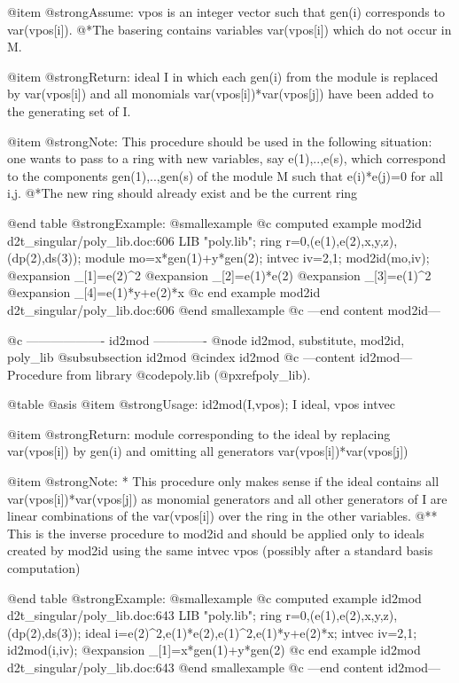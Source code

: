 @item @strong{Assume:}
vpos is an integer vector such that gen(i) corresponds
to var(vpos[i]).
@*The basering contains variables var(vpos[i]) which do not occur
in M.

@item @strong{Return:}
ideal I in which each gen(i) from the module is replaced by
var(vpos[i]) and all monomials var(vpos[i])*var(vpos[j]) have
been added to the generating set of I.

@item @strong{Note:}
This procedure should be used in the following situation:
one wants to pass to a ring with new variables, say e(1),..,e(s),
which correspond to the components gen(1),..,gen(s) of the
module M such that e(i)*e(j)=0 for all i,j.
@*The new ring should already exist and be the current ring

@end table
@strong{Example:}
@smallexample
@c computed example mod2id d2t_singular/poly_lib.doc:606 
LIB "poly.lib";
ring r=0,(e(1),e(2),x,y,z),(dp(2),ds(3));
module mo=x*gen(1)+y*gen(2);
intvec iv=2,1;
mod2id(mo,iv);
@expansion{} _[1]=e(2)^2
@expansion{} _[2]=e(1)*e(2)
@expansion{} _[3]=e(1)^2
@expansion{} _[4]=e(1)*y+e(2)*x
@c end example mod2id d2t_singular/poly_lib.doc:606
@end smallexample
@c ---end content mod2id---

@c ------------------- id2mod -------------
@node id2mod, substitute, mod2id, poly_lib
@subsubsection id2mod
@cindex id2mod
@c ---content id2mod---
Procedure from library @code{poly.lib} (@pxref{poly_lib}).

@table @asis
@item @strong{Usage:}
id2mod(I,vpos); I ideal, vpos intvec

@item @strong{Return:}
module corresponding to the ideal by replacing var(vpos[i]) by
gen(i) and omitting all generators var(vpos[i])*var(vpos[j])

@item @strong{Note:}
* This procedure only makes sense if the ideal contains
all var(vpos[i])*var(vpos[j]) as monomial generators and
all other generators of I are linear combinations of the
var(vpos[i]) over the ring in the other variables.
@** This is the inverse procedure to mod2id and should be applied
only to ideals created by mod2id using the same intvec vpos
(possibly after a standard basis computation)

@end table
@strong{Example:}
@smallexample
@c computed example id2mod d2t_singular/poly_lib.doc:643 
LIB "poly.lib";
ring r=0,(e(1),e(2),x,y,z),(dp(2),ds(3));
ideal i=e(2)^2,e(1)*e(2),e(1)^2,e(1)*y+e(2)*x;
intvec iv=2,1;
id2mod(i,iv);
@expansion{} _[1]=x*gen(1)+y*gen(2)
@c end example id2mod d2t_singular/poly_lib.doc:643
@end smallexample
@c ---end content id2mod---

